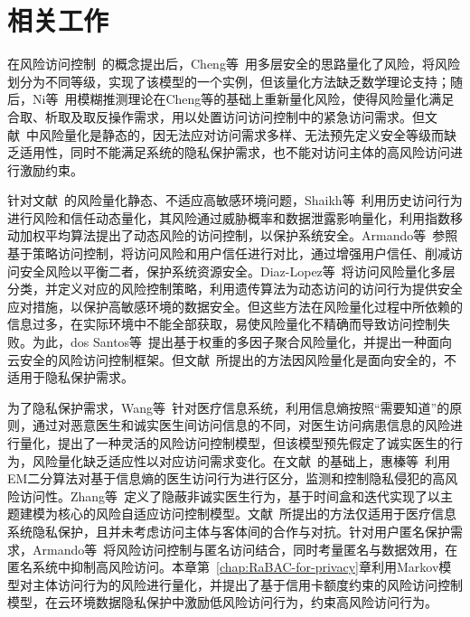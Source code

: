 \section{相关工作}

在风险访问控制~\cite{mcgraw2009risk}的概念提出后，Cheng等~\cite{cheng2007fuzzy}用多层安全的思路量化了风险，将风险划分为不同等级，实现了该模型的一个实例，但该量化方法缺乏数学理论支持；随后，Ni等~\cite{ni2010risk}用模糊推测理论在Cheng等的基础上重新量化风险，使得风险量化满足合取、析取及取反操作需求，用以处置访问访问控制中的紧急访问需求。但文献~\cite{cheng2007fuzzy,ni2010risk}中风险量化是静态的，因无法应对访问需求多样、无法预先定义安全等级而缺乏适用性，同时不能满足系统的隐私保护需求，也不能对访问主体的高风险访问进行激励约束。

针对文献~\cite{cheng2007fuzzy,ni2010risk}的风险量化静态、不适应高敏感环境问题，Shaikh等~\cite{shaikh2012dynamic}利用历史访问行为进行风险和信任动态量化，其风险通过威胁概率和数据泄露影响量化，利用指数移动加权平均算法提出了动态风险的访问控制，以保护系统安全。Armando等~\cite{armando2015balancing}参照基于策略访问控制，将访问风险和用户信任进行对比，通过增强用户信任、削减访问安全风险以平衡二者，保护系统资源安全。Diaz-Lopez等~\cite{diaz-lopez2016dynamic}将访问风险量化多层分类，并定义对应的风险控制策略，利用遗传算法为动态访问的访问行为提供安全应对措施，以保护高敏感环境的数据安全。但这些方法在风险量化过程中所依赖的信息过多，在实际环境中不能全部获取，易使风险量化不精确而导致访问控制失败。为此，dos Santos等~\cite{santos2016framework}提出基于权重的多因子聚合风险量化，并提出一种面向云安全的风险访问控制框架。但文献~\cite{shaikh2012dynamic,armando2015balancing,diaz-lopez2016dynamic,santos2016framework}所提出的方法因风险量化是面向安全的，不适用于隐私保护需求。

为了隐私保护需求，Wang等~\cite{wang2011quantified}针对医疗信息系统，利用信息熵按照“需要知道”的原则，通过对恶意医生和诚实医生间访问信息的不同，对医生访问病患信息的风险进行量化，提出了一种灵活的风险访问控制模型，但该模型预先假定了诚实医生的行为，风险量化缺乏适应性以对应访问需求变化。在文献~\cite{wang2011quantified}的基础上，惠榛等~\cite{hui2015risk}利用EM二分算法对基于信息熵的医生访问行为进行区分，监测和控制隐私侵犯的高风险访问性。Zhang等~\cite{zhang2018privacy}定义了隐蔽非诚实医生行为，基于时间盒和迭代实现了以主题建模为核心的风险自适应访问控制模型。文献~\cite{wang2011quantified,hui2015risk,zhang2018privacy}所提出的方法仅适用于医疗信息系统隐私保护，且并未考虑访问主体与客体间的合作与对抗。针对用户匿名保护需求，Armando等~\cite{armando2015risk}将风险访问控制与匿名访问结合，同时考量匿名与数据效用，在匿名系统中抑制高风险访问。本章第~\ref{chap:RaBAC-for-privacy}章利用Markov模型对主体访问行为的风险进行量化，并提出了基于信用卡额度约束的风险访问控制模型，在云环境数据隐私保护中激励低风险访问行为，约束高风险访问行为。

